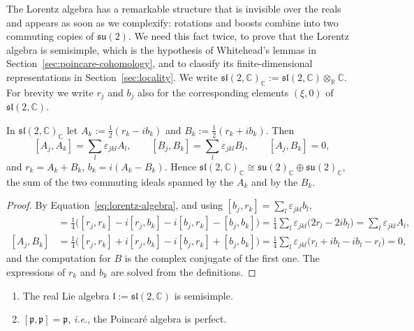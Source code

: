 	The Lorentz algebra has a remarkable structure that is invisible over the reals and appears as soon as we complexify: rotations and boosts combine into two commuting copies of $\mathfrak{su}(2)$. We need this fact twice, to prove that the Lorentz algebra is semisimple, which is the hypothesis of Whitehead's lemmas in Section~\ref{sec:poincare-cohomology}, and to classify its finite-dimensional representations in Section~\ref{sec:locality}. We write $\mathfrak{sl}(2,\mathbb{C})_{\mathbb{C}}:=\mathfrak{sl}(2,\mathbb{C})\otimes_{\mathbb{R}}\mathbb{C}$. For brevity we write $r_j$ and $b_j$ also for the corresponding elements $(\xi,0)$ of $\mathfrak{sl}(2,\mathbb{C})$.
	
	\begin{lemma}\label{lem:chiral}
		In $\mathfrak{sl}(2,\mathbb{C})_{\mathbb{C}}$ let $A_k:=\frac12(r_k-ib_k)$ and $B_k:=\frac12(r_k+ib_k)$. Then
		\begin{equation}\label{eq:chiral-brackets}
			[A_j,A_k]=\sum_l\varepsilon_{jkl}A_l, \qquad [B_j,B_k]=\sum_l\varepsilon_{jkl}B_l, \qquad [A_j,B_k]=0,
		\end{equation}
		and $r_k=A_k+B_k$, $b_k=i(A_k-B_k)$. Hence $\mathfrak{sl}(2,\mathbb{C})_{\mathbb{C}}\cong\mathfrak{su}(2)_{\mathbb{C}}\oplus\mathfrak{su}(2)_{\mathbb{C}}$, the sum of the two commuting ideals spanned by the $A_k$ and by the $B_k$.
	\end{lemma}
	
	\begin{proof}
		By Equation~\eqref{eq:lorentz-algebra}, and using $[b_j,r_k]=\sum_l\varepsilon_{jkl}b_l$,
		\begin{align*}
			[A_j,A_k]&=\tfrac14\big([r_j,r_k]-i[r_j,b_k]-i[b_j,r_k]-[b_j,b_k]\big)=\tfrac14\sum_l\varepsilon_{jkl}\big(2r_l-2ib_l\big)=\sum_l\varepsilon_{jkl}A_l,\\
			[A_j,B_k]&=\tfrac14\big([r_j,r_k]+i[r_j,b_k]-i[b_j,r_k]+[b_j,b_k]\big)=\tfrac14\sum_l\varepsilon_{jkl}\big(r_l+ib_l-ib_l-r_l\big)=0,
		\end{align*}
		and the computation for $B$ is the complex conjugate of the first one. The expressions of $r_k$ and $b_k$ are solved from the definitions.
	\end{proof}
	
	\begin{corollary}\label{cor:poincare-structure}
		\begin{enumerate}
			\item The real Lie algebra $\mathfrak{l}:=\mathfrak{sl}(2,\mathbb{C})$ is semisimple.
			\item $[\mathfrak{p},\mathfrak{p}]=\mathfrak{p}$, \textit{i.e.}, the Poincar\'e algebra is perfect.
		\end{enumerate}
	\end{corollary}
	
